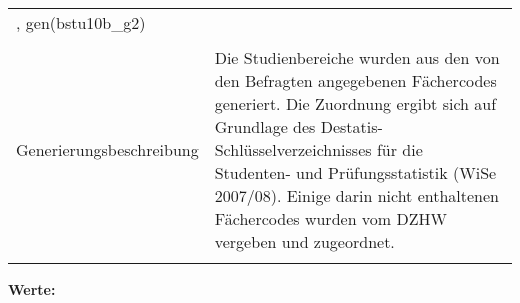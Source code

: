 \begin{tabular}{lL{11.3cm}}
, gen(bstu10b\_g2) \\
				 \\
					Generierungsbeschreibung & Die Studienbereiche wurden aus den von den Befragten angegebenen Fächercodes generiert. Die Zuordnung ergibt sich auf Grundlage des Destatis-Schlüsselverzeichnisses für die Studenten- und Prüfungsstatistik (WiSe 2007/08). Einige darin nicht enthaltenen Fächercodes wurden vom DZHW vergeben und zugeordnet. 
				 \\	
			 \\
		\end{tabular}






			\vspace*{1 cm}
			\noindent\textbf{Werte:}\\
